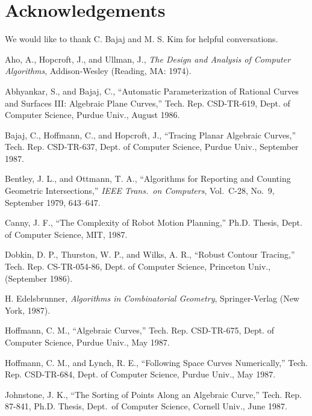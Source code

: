 \SingleSpace
\section*{Acknowledgements}
We would like to thank C. Bajaj and M. S. Kim for helpful conversations.
%
\begin{thebibliography}{88}

 Aho, A., Hopcroft, J., and Ullman, J.,
{\it The Design and Analysis of Computer Algorithms},
Addison-Wesley (Reading, MA: 1974).

 Abhyankar, S., and Bajaj, C., 
``Automatic Parameterization of Rational Curves and Surfaces III:
Algebraic Plane Curves,''
Tech. Rep. CSD-TR-619, Dept. of Computer Science, Purdue Univ.,
August 1986.

 Bajaj, C., Hoffmann, C., and Hopcroft, J.,
``Tracing Planar Algebraic Curves,''
Tech. Rep. CSD-TR-637, Dept. of Computer Science, Purdue Univ.,
September 1987.

 Bentley, J. L., and Ottmann, T. A., 
``Algorithms for Reporting and Counting Geometric Intersections,''
{\it IEEE Trans.\ on Computers}, Vol.~C-28, No.~9, September 1979,
643--647.

 Canny, J. F.,
``The Complexity of Robot Motion Planning,''
Ph.D. Thesis, Dept. of Computer Science, MIT, 1987.

 Dobkin, D. P., Thurston, W. P., and Wilks, A. R.,
``Robust Contour Tracing,''
Tech. Rep. CS-TR-054-86, Dept. of Computer Science, Princeton Univ.,
(September 1986).

H. Edelsbrunner,
{\em Algorithms in Combinatorial Geometry},
Springer-Verlag (New York, 1987).


 Hoffmann, C. M., 
``Algebraic Curves,''
Tech. Rep. CSD-TR-675, Dept. of Computer Science, Purdue Univ.,
May 1987.

 Hoffmann, C. M., and Lynch, R. E., 
``Following Space Curves Numerically,''
Tech. Rep. CSD-TR-684, Dept. of Computer Science, Purdue Univ.,
May 1987.

 Johnstone, J. K.,
``The Sorting of Points Along an Algebraic Curve,''
Tech. Rep. 87-841, Ph.D. Thesis, Dept.\ of Computer Science, 
Cornell Univ., June 1987.



\end{thebibliography}

